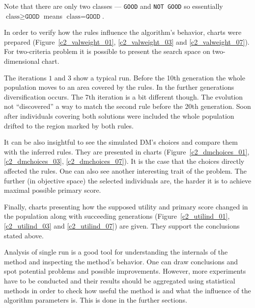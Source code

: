 Note that there are only two classes --- \texttt{GOOD} and \texttt{NOT GOOD}
so essentially $\text{class} \ge \texttt{GOOD}$ means $\text{class} =
\texttt{GOOD}$.

In order to verify how the rules influence the algorithm's behavior, charts
were prepared (Figure~\ref{c2_valweight_01}, \ref{c2_valweight_03} and
\ref{c2_valweight_07}). For two-criteria problem it is possible to present the
search space on two-dimensional chart.

The iterations $1$ and $3$ show a typical run. Before the 10th generation the
whole population moves to an area covered by the rules. In the further
generations diversification occurs. The 7th iteration is a bit different
though. The evolution not ``discovered'' a way to match the second rule before
the 20th generation. Soon after individuals covering both solutions were
included the whole population drifted to the region marked by both rules.

It can be also insightful to see the simulated DM's choices and compare them
with the inferred rules. They are presented in charts
(Figure~\ref{c2_dmchoices_01}, \ref{c2_dmchoices_03},
\ref{c2_dmchoices_07}). It is the case that the choices directly affected the
rules. One can also see another interesting trait of the problem. The further
(in objective space) the selected individuals are, the harder it is to achieve
maximal possible primary score.

Finally, charts presenting how the supposed utility and primary score changed
in the population along with succeeding generations (Figure~\ref{c2_utilind_01},
\ref{c2_utilind_03} and \ref{c2_utilind_07}) are given. They support the
conclusions stated above.

Analysis of single run is a good tool for understanding the internals of the
method and inspecting the method's behavior. One can draw conclusions and spot
potential problems and possible improvements. However, more experiments have to
be conducted and their results should be aggregated using statistical methods
in order to check how useful the method is and what the influence of the
algorithm parameters is. This is done in the further sections.

